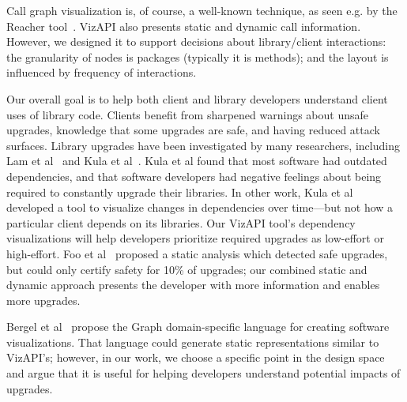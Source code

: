 Call graph visualization is, of course, a well-known technique, as seen e.g. by the Reacher tool~\cite{latoza11:_visual_call_graph}. 
VizAPI also presents static and dynamic call information. However, we designed
it to support decisions about library/client interactions: the granularity of nodes is packages (typically it is methods);
and the layout is influenced by frequency of interactions.

Our overall goal is to help both client and library developers understand
client uses of library code. Clients benefit from sharpened warnings
about unsafe upgrades, knowledge that some upgrades are safe, and
having reduced attack surfaces. Library upgrades have been
investigated by many researchers, including Lam et
al~\cite{lam20:_puttin_seman_seman_version} and Kula et al~\cite{kula18:_do_devel_updat_their_librar_depen}. Kula et al found that most
software had outdated dependencies, and that software developers had
negative feelings about being required to constantly upgrade their
libraries. In other work, Kula et al~\cite{kula14:_visual_evolut_system_their_librar_depen} developed a tool
to visualize changes in dependencies over time---but not how a particular client depends on its libraries. 
Our VizAPI tool's dependency visualizations will help developers
prioritize required upgrades as low-effort or high-effort.
Foo et al~\cite{foo18:_effic_static_check_librar_updat}
proposed a static analysis which detected safe upgrades, but could
only certify safety for 10\% of upgrades; our combined static and
dynamic approach presents the developer with more information and
enables more upgrades. 

Bergel et al~\cite{bergel14:_domain_specif_languag_visual_softw_depen_graph} propose the {\sc Graph} domain-specific language
for creating software visualizations. That language could generate static representations similar to VizAPI's; however,
in our work, we choose a specific point in the design space and argue that it is useful for helping developers understand
potential impacts of upgrades.
